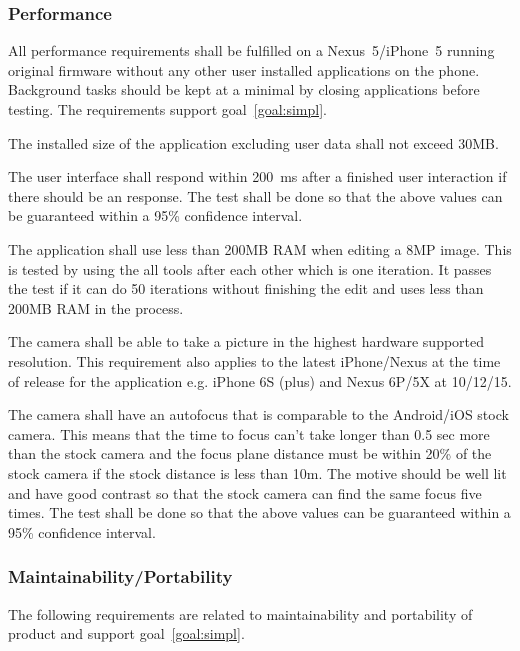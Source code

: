 \documentclass[10pt,a4paper]{article}
\begin{document}
\subsubsection{Performance}
All performance requirements shall be fulfilled on a Nexus~5/iPhone~5 running original firmware without any other user installed applications on the phone. Background tasks should be kept at a minimal by closing applications before testing. The requirements support goal~\ref{goal:simpl}.

\begin{description}
	\item [Req \thesubsubsection {.\theperf} Application size] The installed size of the application excluding user data shall not exceed 30MB.	
	\item [Req \thesubsubsection {.\theperf} Speed] The user interface shall respond within 200~ms after a finished user interaction if there should be an response. The test shall be done so that the above values can be guaranteed within a 95\% confidence interval.
	\item [Req \thesubsubsection {.\theperf} Memory] The application shall use less than 200MB RAM when editing a 8MP image. This is tested by using the all tools after each other which is one iteration. It passes the test if it can do 50 iterations without finishing the edit and uses less than 200MB RAM in the process.
	\item [Req \thesubsubsection {.\theperf} Picture quality] The camera shall be able to take a picture in the highest hardware supported resolution. This requirement also applies to the latest iPhone/Nexus at the time of release for the application e.g. iPhone 6S (plus) and Nexus 6P/5X at 10/12/15.
	\item [Req \thesubsubsection {.\theperf} Autofocus] The camera shall have an autofocus that is comparable to the Android/iOS stock camera. This means that the time to focus can't take longer than 0.5 sec more than the stock camera and the focus plane distance must be within 20\% of the stock camera if the stock distance is less than 10m. The motive should be well lit and have good contrast so that the stock camera can find the same focus five times. The test shall be done so that the above values can be guaranteed within a 95\% confidence interval.
\end{description}

\subsubsection{Maintainability/Portability}
The following requirements are related to maintainability and portability of product and support goal~\ref{goal:simpl}.
\end{document}
